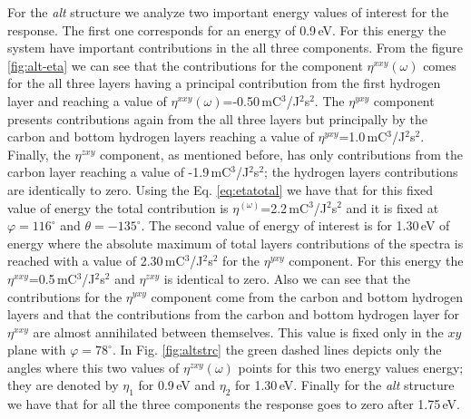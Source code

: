 \documentclass[pss]{wiley2sp} %
\begin{document}
For the \emph{alt} structure we analyze two important energy values of interest for the response. The first one corresponds for an energy of 0.9\,eV. For this energy the system have important contributions in the all three components. From the figure \ref{fig:alt-eta} we can see that the contributions for the component $\eta^{xxy}(\omega)$ comes for the all three layers having a principal contribution from the first hydrogen layer and reaching a value of $\eta^{xxy}(\omega)$=-0.50\,mC$^{3}$/J$^{2}$s$^{2}$. The $\eta^{yxy}$ component presents contributions again from the all three layers but principally by the carbon and bottom hydrogen layers reaching a value of $\eta^{yxy}$=1.0\,mC$^{3}$/J$^{2}$s$^{2}$. Finally, the $\eta^{zxy}$ component, as mentioned before, has only contributions from the carbon layer reaching a value of -1.9\,mC$^{3}$/J$^{2}$s$^{2}$; the hydrogen layers contributions are identically to zero. Using the Eq. \eqref{eq:etatotal} we have that for this fixed value of energy the total contribution is $\eta^(\omega)$=2.2\,mC$^{3}$/J$^{2}$s$^{2}$ and it is fixed at $\varphi=116^{\circ}$ and $\theta=-135^{\circ}$. The second value of energy of interest is for 1.30\,eV of energy where the absolute maximum of total layers contributions of the spectra is reached with a value of 2.30\,mC$^{3}$/J$^{2}$s$^{2}$ for the $\eta^{yxy}$ component. For this energy the $\eta^{xxy}$=0.5\,mC$^{3}$/J$^{2}$s$^{2}$ and $\eta^{zxy}$ is identical to zero. Also we can see that the contributions for the $\eta^{yxy}$ component come from the carbon and bottom hydrogen layers and that the contributions from the carbon and bottom hydrogen layer for $\eta^{xxy}$ are almost annihilated between themselves. This value is fixed only in the $xy$ plane with $\varphi=78^{\circ}$. In Fig. \ref{fig:altstrc} the green dashed lines depicts only the angles where this two values of $\eta^{zxy}(\omega)$ points for this two energy values energy; they are denoted by $\eta_{1}$ for 0.9\,eV and $\eta_{2}$ for 1.30\,eV. Finally for the \emph{alt} structure  we have that for all the three components the response goes to zero after 1.75\,eV. 
\end{document}

